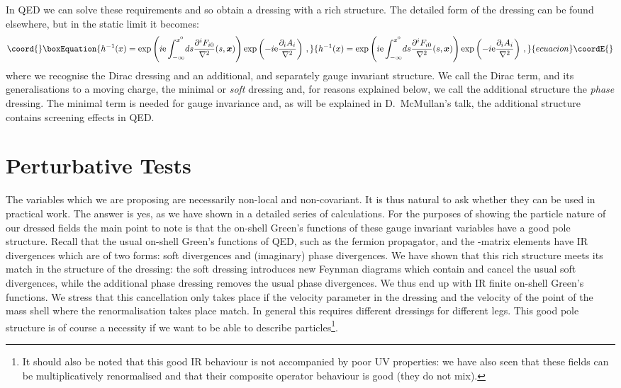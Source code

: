 \documentclass[12pt,a4paper]{article}
\providecommand{\xb}{{\boldsymbol x}}
\providecommand{\ex}{{\mathrm{e}}}
\providecommand{\pa}{\partial}
\begin{document}
In QED we can solve these requirements and so obtain a dressing with a rich structure. The detailed
form of the dressing can be found elsewhere, but in the static limit it becomes:
\begin{equation}\coord{}\boxEquation{
  h^{-1}(x)=\exp\left(i\ex\int_{-\infty}^{x^0}\!ds
  \frac{\pa^iF_{i0}}{\nabla^2}(s,\xb)\right)
  \exp\left(-i\ex\frac{\pa_i A_i}{\nabla^2}\right)\,,
}{
  h^{-1}(x)=\exp\left(i\ex\int_{-\infty}^{x^0}\!ds
  \frac{\pa^iF_{i0}}{\nabla^2}(s,\xb)\right)
  \exp\left(-i\ex\frac{\pa_i A_i}{\nabla^2}\right)\,,
}{ecuacion}\coordE{}\end{equation}
where we recognise the Dirac dressing and an additional, and separately gauge invariant structure.
We call the Dirac term, and its generalisations to a moving charge, the minimal or \emph{soft} dressing
and, for reasons explained below, we call the additional structure the \emph{phase} dressing.
The minimal term is needed for gauge invariance and, as will be explained in D.~McMullan's talk, the additional
structure contains screening effects in QED.

\section*{Perturbative Tests}
The variables which we are proposing are necessarily non-local and non-covariant. It is thus
natural to ask whether
they can be used in practical work. The answer is yes, as we have shown
in a detailed series of calculations\cite{Bagan:1998kg,Bagan:1999jk}.
For the purposes of showing the particle nature of our dressed
fields the main point to note is that the on-shell Green's functions of these gauge invariant variables have a
good pole structure. Recall that the usual on-shell Green's functions of QED, such as the fermion propagator,
and the \coordHE{}-matrix elements have IR divergences which are of two forms: soft divergences and (imaginary) phase
divergences. We have shown that this rich structure meets its match in the structure of the dressing: the soft
dressing introduces new Feynman diagrams which contain and cancel the usual soft divergences, while the additional
phase dressing removes the usual phase divergences. We thus end up with IR finite on-shell Green's functions. We stress
that this cancellation only takes place if the velocity parameter in the dressing and the velocity of the point of the
mass shell where the renormalisation takes place match. In general this requires different dressings for
different legs.
This good pole structure is of course a necessity if we want to be able to describe
particles\footnote{It should also be noted that this
good IR behaviour is not accompanied by poor UV properties: we have also seen that these fields can be
multiplicatively
renormalised and that their composite operator behaviour is good (they do not mix\cite{Bagan:1999jk}).}.
\end{document}
